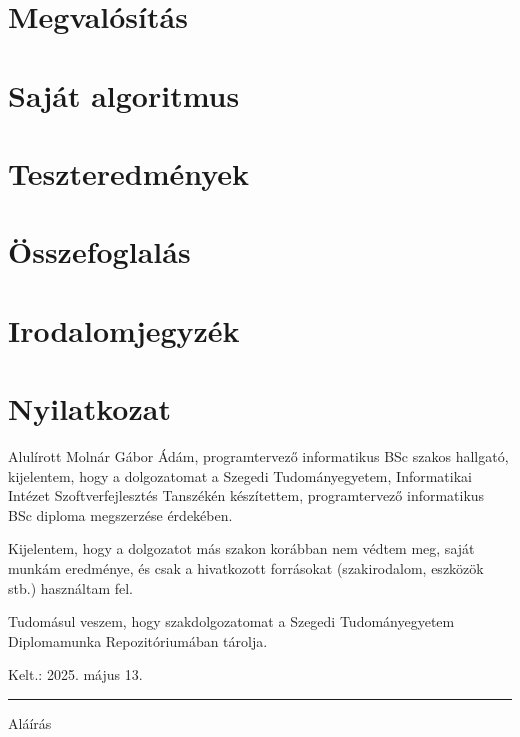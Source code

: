 \documentclass[12pt]{report} %
\begin{document}
\chapter{Megvalósítás} %

\chapter{Saját algoritmus} %

\chapter{Teszteredmények} %

\chapter{Összefoglalás} %

\chapter{Irodalomjegyzék} %

\chapter{Nyilatkozat} %

Alulírott Molnár Gábor Ádám, programtervező informatikus BSc szakos hallgató, kijelentem, hogy a dolgozatomat a Szegedi Tudományegyetem, Informatikai Intézet Szoftverfejlesztés Tanszékén készítettem, programtervező informatikus BSc diploma megszerzése érdekében.

Kijelentem, hogy a dolgozatot más szakon korábban nem védtem meg, saját munkám eredménye, és csak a hivatkozott forrásokat (szakirodalom, eszközök stb.) használtam fel.

Tudomásul veszem, hogy szakdolgozatomat a Szegedi Tudományegyetem Diplomamunka Repozitóriumában tárolja.

\vspace{1cm}

{\large Kelt.: 2025. május 13.}

\vspace{0.5cm}
\hfill
\parbox{5cm}{\centering\hrule\vspace{0.3cm} Aláírás}
\end{document}
